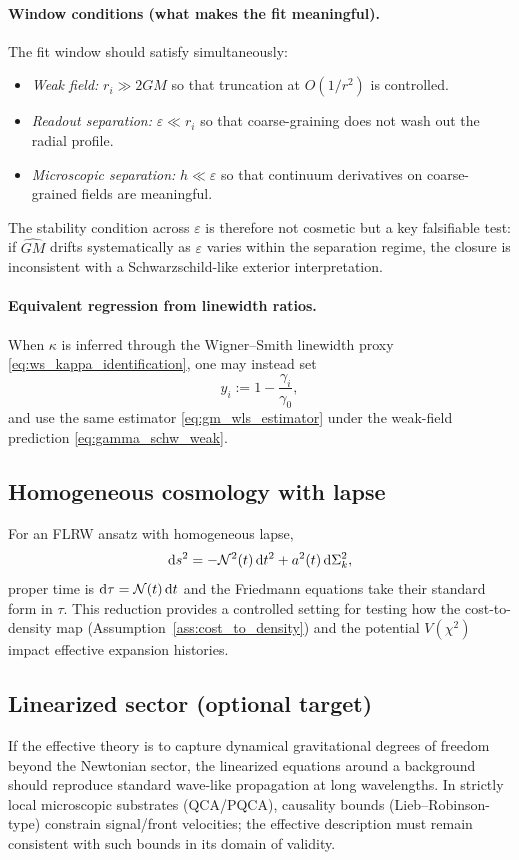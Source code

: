 \paragraph{Window conditions (what makes the fit meaningful).}
The fit window should satisfy simultaneously:
\begin{itemize}
  \item \emph{Weak field:} $r_i\gg 2GM$ so that truncation at $O(1/r^2)$ is controlled.
  \item \emph{Readout separation:} $\varepsilon \ll r_i$ so that coarse-graining does not wash out the radial profile.
  \item \emph{Microscopic separation:} $h\ll \varepsilon$ so that continuum derivatives on coarse-grained fields are meaningful.
\end{itemize}
The stability condition across $\varepsilon$ is therefore not cosmetic but a key falsifiable test: if $\widehat{GM}$ drifts systematically as $\varepsilon$ varies within the separation regime, the closure is inconsistent with a Schwarzschild-like exterior interpretation.

\paragraph{Equivalent regression from linewidth ratios.}
When $\kappa$ is inferred through the Wigner--Smith linewidth proxy \eqref{eq:ws_kappa_identification}, one may instead set
\begin{equation}
  y_i := 1-\frac{\gamma_i}{\gamma_0},
\end{equation}
and use the same estimator \eqref{eq:gm_wls_estimator} under the weak-field prediction \eqref{eq:gamma_schw_weak}.

\subsection{Homogeneous cosmology with lapse}
\label{subsec:frw_lapse}

For an FLRW ansatz with homogeneous lapse,
\begin{equation}
  \mathrm{d} s^2 = -\mathcal{N}^2(t)\,\mathrm{d} t^2 + a^2(t)\,\mathrm{d}\Sigma_k^2,
\end{equation}
proper time is $\mathrm{d}\tau=\mathcal{N}(t)\,\mathrm{d} t$ and the Friedmann equations take their standard form in $\tau$.
This reduction provides a controlled setting for testing how the cost-to-density map (Assumption~\ref{ass:cost_to_density}) and the potential $V(\chi^2)$ impact effective expansion histories.

\subsection{Linearized sector (optional target)}
\label{subsec:linearized_target}

If the effective theory is to capture dynamical gravitational degrees of freedom beyond the Newtonian sector, the linearized equations around a background should reproduce standard wave-like propagation at long wavelengths.
In strictly local microscopic substrates (QCA/PQCA), causality bounds (Lieb--Robinson-type) constrain signal/front velocities; the effective description must remain consistent with such bounds in its domain of validity.


